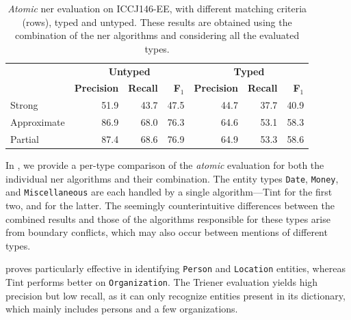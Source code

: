 \begin{table}[H]
    \centering
    \begin{tabular}{l|rrr|rrr}
        \toprule
        & \multicolumn{3}{c|}{\textbf{Untyped}} & \multicolumn{3}{c}{\textbf{Typed}} \\
        & \textbf{Precision} & \textbf{Recall} & \textbf{F$_1$} & \textbf{Precision} & \textbf{Recall} & \textbf{F$_1$} \\
        \midrule
        Strong              & 51.9 &	43.7 &	47.5 & 44.7 &	37.7 &	40.9  \\
        Approximate         & 86.9 &	68.0 &	76.3 & 64.6 &	53.1 &	58.3 \\
        Partial             & 87.4 &	68.6 &	76.9 & 64.9 &	53.3 &	58.6 \\ 
        \bottomrule
    \end{tabular}
    \caption[\textit{Atomic} \ac{ner} evaluation on ICCJ146-EE.]{\textit{Atomic} \ac{ner} evaluation on ICCJ146-EE, with different matching criteria (rows), typed and untyped. These results are obtained using the combination of the \ac{ner} algorithms and considering all the evaluated types.}
    \label{tab:nereval:bymetric}
\end{table}

In , we provide a per-type comparison of the \textit{atomic} evaluation for both the individual \ac{ner} algorithms and their combination. The entity types \texttt{Date}, \texttt{Money}, and \texttt{Miscellaneous} are each handled by a single algorithm---Tint for the first two, and \spacy for the latter. The seemingly counterintuitive differences between the combined results and those of the algorithms responsible for these types arise from boundary conflicts, which may also occur between mentions of different types.

\Spacy proves particularly effective in identifying \texttt{Person} and \texttt{Location} entities, whereas Tint performs better on \texttt{Organization}. The Trie\ac{ner} evaluation yields high precision but low recall, as it can only recognize entities present in its dictionary, which mainly includes persons and a few organizations.

